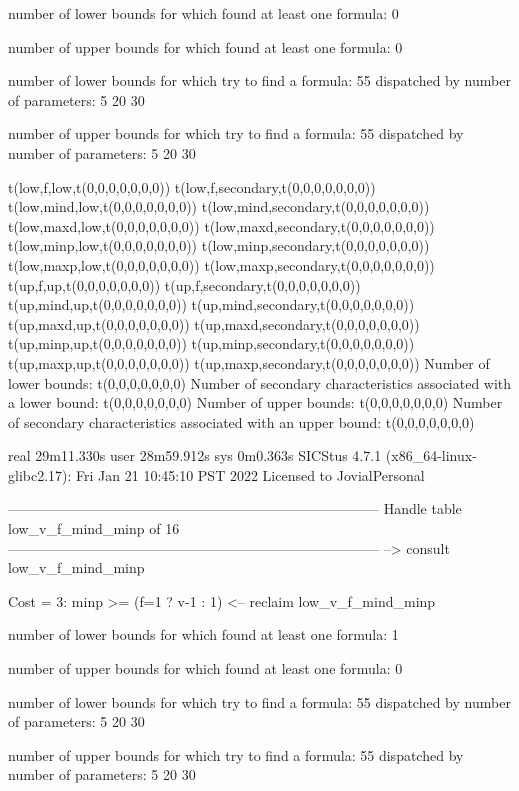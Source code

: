 number of lower bounds for which found at least one formula: 0

number of upper bounds for which found at least one formula: 0

number of lower bounds for which try to find a formula: 55
dispatched by number of parameters: 5  20  30

number of upper bounds for which try to find a formula: 55
dispatched by number of parameters: 5  20  30

t(low,f,low,t(0,0,0,0,0,0,0))
t(low,f,secondary,t(0,0,0,0,0,0,0))
t(low,mind,low,t(0,0,0,0,0,0,0))
t(low,mind,secondary,t(0,0,0,0,0,0,0))
t(low,maxd,low,t(0,0,0,0,0,0,0))
t(low,maxd,secondary,t(0,0,0,0,0,0,0))
t(low,minp,low,t(0,0,0,0,0,0,0))
t(low,minp,secondary,t(0,0,0,0,0,0,0))
t(low,maxp,low,t(0,0,0,0,0,0,0))
t(low,maxp,secondary,t(0,0,0,0,0,0,0))
t(up,f,up,t(0,0,0,0,0,0,0))
t(up,f,secondary,t(0,0,0,0,0,0,0))
t(up,mind,up,t(0,0,0,0,0,0,0))
t(up,mind,secondary,t(0,0,0,0,0,0,0))
t(up,maxd,up,t(0,0,0,0,0,0,0))
t(up,maxd,secondary,t(0,0,0,0,0,0,0))
t(up,minp,up,t(0,0,0,0,0,0,0))
t(up,minp,secondary,t(0,0,0,0,0,0,0))
t(up,maxp,up,t(0,0,0,0,0,0,0))
t(up,maxp,secondary,t(0,0,0,0,0,0,0))
Number of lower bounds:                                             t(0,0,0,0,0,0,0)
Number of secondary characteristics associated with a lower bound:  t(0,0,0,0,0,0,0)
Number of upper bounds:                                             t(0,0,0,0,0,0,0)
Number of secondary characteristics associated with an upper bound: t(0,0,0,0,0,0,0)

real	29m11.330s
user	28m59.912s
sys	0m0.363s
SICStus 4.7.1 (x86_64-linux-glibc2.17): Fri Jan 21 10:45:10 PST 2022
Licensed to JovialPersonal


--------------------------------------------------------------------------------
Handle table low_v_f_mind_minp of 16
--------------------------------------------------------------------------------
--> consult low_v_f_mind_minp

Cost =  3:  minp >= (f=1 ? v-1 : 1)
<-- reclaim low_v_f_mind_minp

number of lower bounds for which found at least one formula: 1

number of upper bounds for which found at least one formula: 0

number of lower bounds for which try to find a formula: 55
dispatched by number of parameters: 5  20  30

number of upper bounds for which try to find a formula: 55
dispatched by number of parameters: 5  20  30

